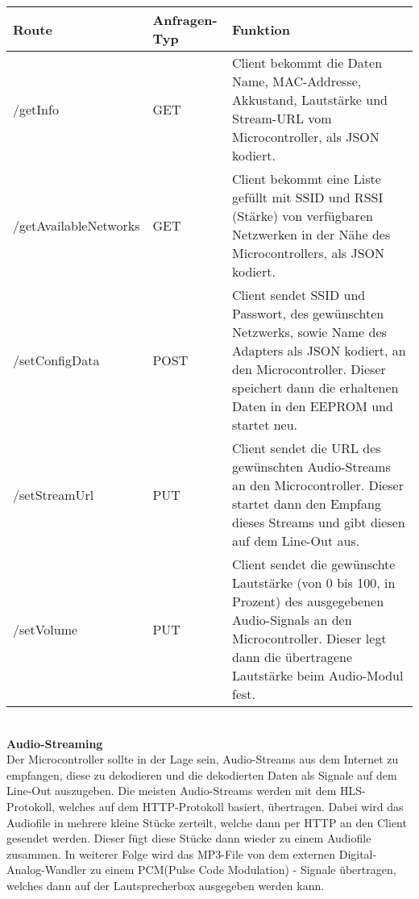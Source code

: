 \documentclass[]{article}
\begin{document}
\begin{tabularx}{\textwidth}{|l|l|X|}
\hline
\textbf{Route} & \textbf{Anfragen-Typ} & \textbf{Funktion} \\
\hline
/getInfo & GET & Client bekommt die Daten Name, MAC-Addresse, Akkustand, Lautstärke und Stream-URL vom Microcontroller, als JSON kodiert. \\
\hline 
/getAvailableNetworks & GET & Client bekommt eine Liste gefüllt mit SSID und RSSI (Stärke) von verfügbaren Netzwerken in der Nähe des Microcontrollers, als JSON kodiert. \\
\hline
/setConfigData & POST & Client sendet SSID und Passwort, des gewünschten Netzwerks, sowie Name des Adapters als JSON kodiert, an den Microcontroller. Dieser speichert dann die erhaltenen Daten in den EEPROM und startet neu.\\
\hline
/setStreamUrl & PUT & Client sendet die URL des gewünschten Audio-Streams an den Microcontroller. Dieser startet dann den Empfang dieses Streams und gibt diesen auf dem Line-Out aus. \\
\hline
/setVolume & PUT & Client sendet die gewünschte Lautstärke (von 0 bis 100, in Prozent) des ausgegebenen Audio-Signals an den Microcontroller. Dieser legt dann die übertragene Lautstärke beim Audio-Modul fest. \\
\hline
\end{tabularx} \newline \\
\textbf{Audio-Streaming} \\
Der Microcontroller sollte in der Lage sein, Audio-Streams aus dem Internet zu empfangen, diese zu dekodieren und die dekodierten Daten als Signale auf dem Line-Out auszugeben. Die meisten Audio-Streams werden mit dem HLS-Protokoll, welches auf dem HTTP-Protokoll basiert, übertragen. Dabei wird das Audiofile in mehrere kleine Stücke zerteilt, welche dann per HTTP an den Client gesendet werden. Dieser fügt diese Stücke dann wieder zu einem Audiofile zusammen. In weiterer Folge wird das MP3-File von dem externen Digital-Analog-Wandler zu einem PCM(\glqq Pulse Code Modulation\grqq{}) - Signale übertragen, welches dann auf der Lautsprecherbox ausgegeben werden kann.
\end{document}
